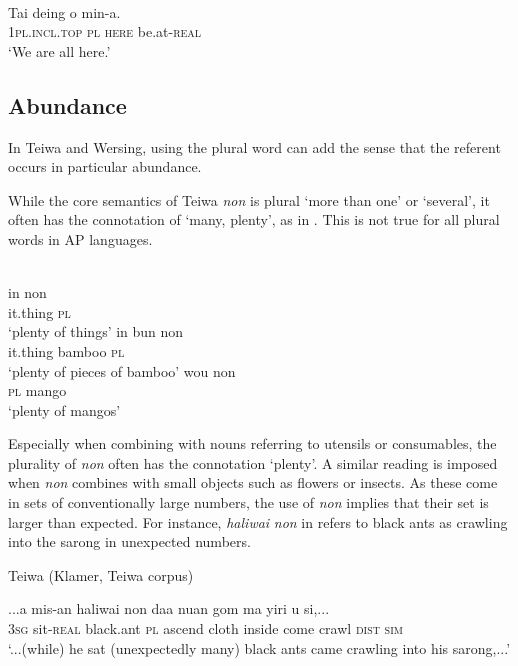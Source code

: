 \ea%
\label{ex:9:72}
 \\
\gll Tai deing o min-a.  \\
   \textsc{1pl.incl.top} \textsc{pl}   \textsc{here} be.at-\textsc{real}  \\
\glt `We are all here.'
\z






\subsection{Abundance} %
\label{sec:9:4.2}
In Teiwa and Wersing, using the plural word can add the sense that the referent occurs in particular abundance.

While the core semantics of Teiwa \textit{non} is plural `more than one' or `several', it often has the connotation of `many, plenty', as in . This is not true for all plural words in AP languages.


\ea%
\label{ex:9:73}
 \\
\ea
\gll  in  non\\
   it.thing  \textsc{pl} \\
   \glt `plenty of things' 
\ex
\gll in  bun non \\
it.thing bamboo \textsc{pl} \\
\glt `plenty of pieces of bamboo'
\ex 
\gll wou  non\\
\textsc{pl} mango\\
\glt  `plenty of mangos'
\z
\z

Especially when combining with nouns referring to utensils or consumables, the plurality of \textit{non} often has the connotation `plenty'. A similar reading is imposed when \textit{non} combines with small objects such as flowers or insects. As these come in sets of conventionally large numbers, the use of \textit{non} implies that their set is larger than expected. For instance, \textit{haliwai} \textit{non} in  refers to black ants as crawling into the sarong in unexpected numbers.

Teiwa (Klamer, Teiwa corpus)

\ea%
\label{ex:9:74}
\gll ...a mis-an haliwai non daa nuan gom ma yiri  u si,... \\
  \textsc{3sg} sit-\textsc{real} black.ant \textsc{pl} ascend cloth inside come crawl \textsc{dist} \textsc{sim}  \\
\glt `...(while) he sat (unexpectedly many) black ants came crawling into his sarong,...'
\z






